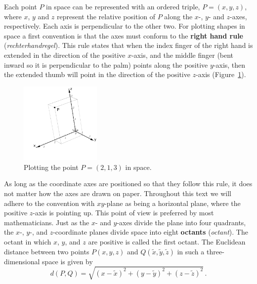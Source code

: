 Each point $P$ in space can be represented with an ordered triple, $P=(x,y,z)$, where $x$, $y$ and $z$ represent the relative position of $P$ along the $x$-, $y$- and $z$-axes, respectively. Each axis is perpendicular to the other two. For plotting shapes in space a first convention is that the axes must conform to the \textbf{right hand rule} (\textit{rechterhandregel}). This rule states that when the index finger of the right hand is extended in the direction of the positive $x$-axis, and the middle finger (bent inward so it is perpendicular to the palm) points along the positive $y$-axis, then the extended thumb will point in the direction of the positive $z$-axis (Figure~\ref{fig_vector_13}). 

	\begin{figure}[h]
	\begin{center}
			\includegraphics[width=0.35\textwidth]{fig_vector_13}
	\caption{Plotting the point $P=(2,1,3)$ in space. }
	\label{fig_vector_13}
	\end{center}
\end{figure}

As long as the coordinate axes are positioned so that they follow this rule, it does not matter how the axes are drawn on paper. Throughout this text we will adhere to the convention with $xy$-plane as being a horizontal plane, where the positive $z$-axis is pointing up. This point of view is preferred by most mathematicians. Just as the $x$- and $y$-axes divide the plane into four quadrants, the $x$-, $y$-, and $z$-coordinate planes divide space into eight \textbf{octants} (\textit{octant}).  The octant in which $x$, $y$, and $z$ are positive is called the first octant.  The Euclidean distance between two points $P\left(x, y,z\right)$ and  $Q\left(\widetilde{x}, \widetilde{y},\widetilde{z}\right)$ in such a three-dimensional space is given by 
\begin{equation}
d(P,Q)=\sqrt{\left(x-\widetilde{x}\right)^2+\left(y-\widetilde{y}\right)^2+\left(z-\widetilde{z}\right)^2}\,.
\label{def:space_distance}
\end{equation}



